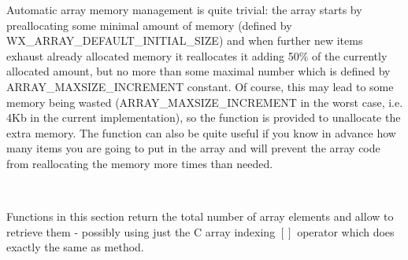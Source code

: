\label{wxarraymemorymanagement}

Automatic array memory management is quite trivial: the array starts by
preallocating some minimal amount of memory (defined by
WX\_ARRAY\_DEFAULT\_INITIAL\_SIZE) and when further new items exhaust already
allocated memory it reallocates it adding 50\% of the currently allocated
amount, but no more than some maximal number which is defined by
ARRAY\_MAXSIZE\_INCREMENT constant. Of course, this may lead to some memory
being wasted (ARRAY\_MAXSIZE\_INCREMENT in the worst case, i.e. 4Kb in the
current implementation), so the  function is
provided to unallocate the extra memory. The  
function can also be quite useful if you know in advance how many items you are
going to put in the array and will prevent the array code from reallocating the
memory more times than needed.

\\


Functions in this section return the total number of array elements and allow to
retrieve them - possibly using just the C array indexing $[]$ operator which
does exactly the same as  method.

\\
\\
\\
\\


\\
\\


\\
\\
\\
\\

